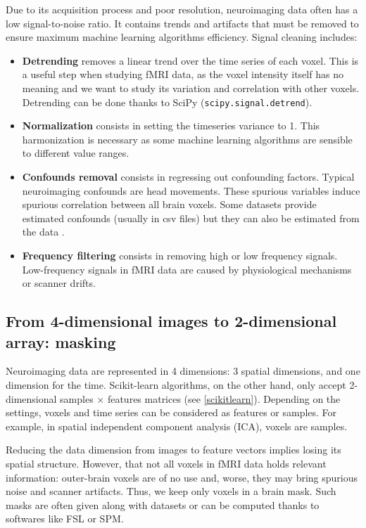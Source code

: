 \documentclass{frontiersSCNS} %
\begin{document}
Due to its acquisition process and poor resolution, neuroimaging data often has a low
signal-to-noise ratio. It contains trends and artifacts that must be removed
to ensure maximum machine learning algorithms efficiency. Signal cleaning
includes:
\begin{itemize}
    \item{\bf Detrending} removes a linear trend over the time series of each
        voxel. This is a useful step when studying fMRI data, as the voxel
        intensity itself has no meaning and we want to study its variation and
        correlation with other voxels. Detrending can be done thanks to SciPy
        (\texttt{scipy.signal.detrend}).
    \item{\bf Normalization} consists in setting the timeseries variance to 1.
        This harmonization is necessary as some machine learning algorithms are
        sensible to different value ranges.
    \item{\bf Confounds removal} consists in regressing out confounding factors.
        Typical neuroimaging confounds are head movements. These spurious
        variables induce spurious correlation between all brain voxels.
        Some datasets provide estimated confounds (usually in csv files) but
        they can also be estimated from the data \citep{behzadi2007}.
    \item{\bf Frequency filtering} consists in removing high or low
        frequency signals. Low-frequency signals in fMRI data are caused by
        physiological mechanisms or scanner drifts.
\end{itemize}

\subsection{From 4-dimensional images to 2-dimensional array: masking}

Neuroimaging data are represented in 4 dimensions: 3 spatial dimensions, and 
one dimension for the time.
Scikit-learn algorithms, on the other hand, only accept 2-dimensional
samples $\times$ features matrices (see \ref{scikitlearn}).
Depending on the settings, voxels and time series can be
considered as features
or samples. For example, in spatial independent component analysis (ICA),
voxels are samples.


Reducing the data dimension from images to feature vectors implies losing its
spatial structure. However, that not all voxels in fMRI data holds 
relevant information: outer-brain voxels are of no
use and, worse, they may bring spurious noise and scanner artifacts.
Thus, we keep only voxels in a brain mask. Such masks
are often given along with datasets or can be computed thanks to softwares like
FSL or SPM.
\end{document}
